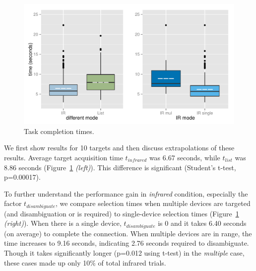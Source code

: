 \begin{figure}[t]
\centering
\includegraphics[width=1.0\columnwidth]{figures/R_time_by_Category.pdf}
\caption{Task completion times.} 
\label{fig:selection-times}
\end{figure}

We first show results for 10 targets and then discuss extrapolations of these results. Average target acquisition time $t_{infrared}$ was 6.67 seconds, while $t_{list}$ was 8.86 seconds (Figure~\ref{fig:selection-times} {\em (left)}). This difference is significant (Student's t-test, p=0.00017).  

To further understand the performance gain in {\em infrared} condition, especially the factor $t_{disambiguate}$, we compare selection times when multiple devices are targeted (and disambiguation or is required) to single-device selection times (Figure~\ref{fig:selection-times} {\em (right)}). When there is a single device, $t_{disambiguate}$ is 0 and it takes 6.40 seconds (on average) to complete the connection. When multiple devices are in range, the time increases to 9.16 seconds, indicating 2.76 seconds required to disambiguate. Though it takes significantly longer (p=0.012 using t-test) in the {\em multiple} case, these cases made up only 10\% of total infrared trials.

